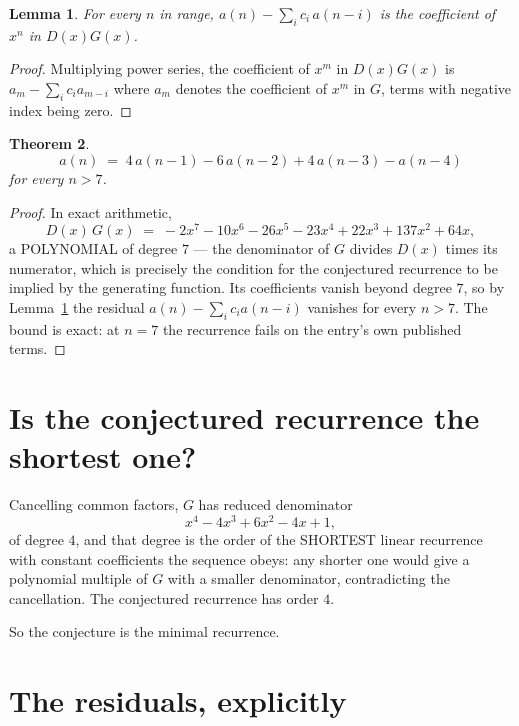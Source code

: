 \documentclass[11pt,a4paper]{article}
\theoremstyle{plain}
\newtheorem{theorem}{Theorem}
\newtheorem{lemma}[theorem]{Lemma}
\theoremstyle{definition}
\begin{document}
\begin{lemma}\label{lem:key}
For every $n$ in range, $a(n)-\sum_i c_i\,a(n-i)$ is the coefficient of $x^{n}$ in
$D(x)G(x)$.
\end{lemma}

\begin{proof}
Multiplying power series, the coefficient of $x^{m}$ in $D(x)G(x)$ is
$a_m-\sum_i c_i a_{m-i}$ where $a_m$ denotes the coefficient of $x^{m}$ in $G$, terms with
negative index being zero.
\end{proof}

\begin{theorem}
\[
a(n)\;=\;4\,a(n-1) - 6\,a(n-2) + 4\,a(n-3) - a(n-4)
\]
for every $n>7$.
\end{theorem}

\begin{proof}
In exact arithmetic,
\[
D(x)\,G(x)\;=\;- 2 x^{7} - 10 x^{6} - 26 x^{5} - 23 x^{4} + 22 x^{3} + 137 x^{2} + 64 x,
\]
a POLYNOMIAL of degree $7$ --- the denominator of $G$ divides $D(x)$ times its numerator,
which is precisely the condition for the conjectured recurrence to be implied by the
generating function. Its coefficients vanish beyond degree $7$, so by
Lemma~\ref{lem:key} the residual $a(n)-\sum_ic_ia(n-i)$ vanishes for every
$n>7$. The bound is exact: at $n=7$ the recurrence fails on the entry's own published terms.
\end{proof}

\section{Is the conjectured recurrence the shortest one?}

Cancelling common factors, $G$ has reduced denominator
\[
x^{4} - 4 x^{3} + 6 x^{2} - 4 x + 1,
\]
of degree $4$, and that degree is the order of the SHORTEST linear recurrence with
constant coefficients the sequence obeys: any shorter one would give a polynomial multiple of
$G$ with a smaller denominator, contradicting the cancellation. The conjectured recurrence has
order $4$.

So the conjecture is the minimal recurrence.

\section{The residuals, explicitly}
\end{document}
